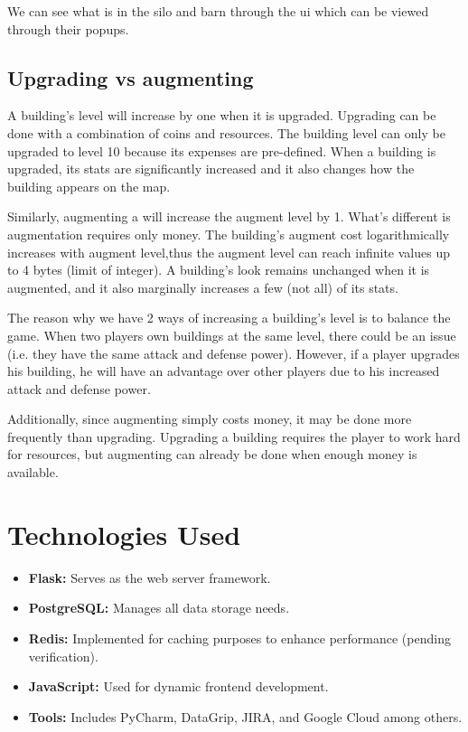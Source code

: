 \documentclass[12pt]{article}
\begin{document}
We can see what is in the silo and barn through the ui which can be viewed through their popups.
\subsection{Upgrading vs augmenting}
A building's level will increase by one when it is upgraded.
Upgrading can be done with a combination of coins and resources.
The building level can only be upgraded to level 10 because its expenses are pre-defined.
When a building is upgraded, its stats are significantly increased and it also changes how the building appears on the map.


Similarly, augmenting a will increase the augment level by 1.
What's different is augmentation requires only money.
The building's augment cost logarithmically increases with augment level,thus the augment level can reach infinite values up to 4 bytes (limit of integer).
A building's look remains unchanged when it is augmented, and it also marginally increases a few (not all) of its stats.

The reason why we have 2 ways of increasing a building's level is to balance the game.
When two players own buildings at the same level, there could be an issue (i.e. they have the same attack and defense power).
However, if a player upgrades his building, he will have an advantage over other players due to his increased attack and defense power.

Additionally, since augmenting simply costs money, it may be done more frequently than upgrading.
Upgrading a building requires the player to work hard for resources, but augmenting can already be done when enough money is available.

\section{Technologies Used}
\begin{itemize}
    \item \textbf{Flask:} Serves as the web server framework.
    \item \textbf{PostgreSQL:} Manages all data storage needs.
    \item \textbf{Redis:} Implemented for caching purposes to enhance performance (pending verification).
    \item \textbf{JavaScript:} Used for dynamic frontend development.
    \item \textbf{Tools:} Includes PyCharm, DataGrip, JIRA, and Google Cloud among others.
\end{itemize}
\end{document}
